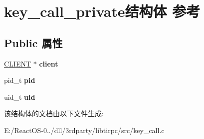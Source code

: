 \hypertarget{structkey__call__private}{}\section{key\+\_\+call\+\_\+private结构体 参考}
\label{structkey__call__private}
\subsection*{Public 属性}
\begin{DoxyCompactItemize}
\item 
\mbox{\label{structkey__call__private_a61b483f8bfcc4397fa4c00c09efe0b51}} 
\hyperlink{struct____rpc__client}{C\+L\+I\+E\+NT} $\ast$ {\bfseries client}
\item 
\mbox{\label{structkey__call__private_af8b82145556732b003365d906c43bd65}} 
pid\+\_\+t {\bfseries pid}
\item 
\mbox{\label{structkey__call__private_aa69d119c33ad1f723a47c20a6ba62ccd}} 
uid\+\_\+t {\bfseries uid}
\end{DoxyCompactItemize}


该结构体的文档由以下文件生成\+:\begin{DoxyCompactItemize}
\item 
E\+:/\+React\+O\+S-\/0../dll/3rdparty/libtirpc/src/key\+\_\+call.\+c\end{DoxyCompactItemize}
